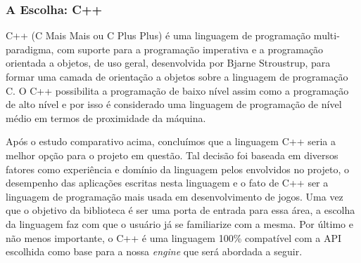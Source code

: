 \subsubsection{A Escolha: C++}
%
C++ (C Mais Mais ou C Plus Plus) \cite{Mizrahi} é uma linguagem de programação multi-paradigma, com suporte para a programação imperativa e a programação orientada a objetos, de uso geral, desenvolvida por Bjarne Stroustrup, para formar uma camada de orientação a objetos sobre a linguagem de programação C. O C++ possibilita a programação de baixo nível assim como a programação de alto nível e por isso é considerado uma linguagem de programação de nível médio em termos de proximidade da máquina.
\par
Após o estudo comparativo acima, concluímos que a linguagem C++ seria a melhor opção para o projeto em questão. Tal decisão foi baseada em diversos fatores como experiência e domínio da linguagem pelos envolvidos no projeto, o desempenho das aplicações escritas nesta linguagem e o fato de C++ ser a linguagem de programação mais usada em desenvolvimento de jogos. Uma vez que o objetivo da biblioteca é ser uma porta de entrada para essa área, a escolha da linguagem faz com que o usuário já se familiarize com a mesma. Por último e não menos importante, o C++ é uma linguagem 100\% compatível com a API escolhida como base para a nossa \textit{engine} que será abordada a seguir.
%
%
